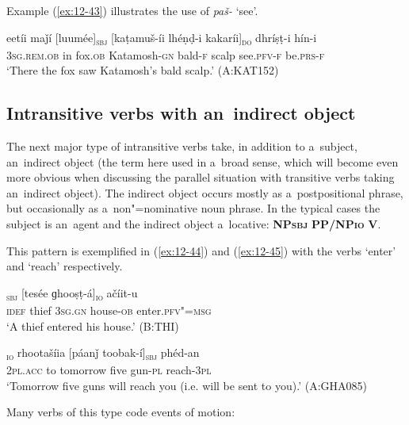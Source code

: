 Example (\ref{ex:12-43}) illustrates the use of \textit{paš-} `see'.

\begin{exe}
\ex
\label{ex:12-43}
\gll eetíi maǰí [luumée]\textsubscript{\textsc{sbj}} [kaṭamuš-íi lhéṇḍ-i kakaríi]\textsubscript{\textsc{do}} dhríṣṭ-i hín-i \\
\textsc{3sg.rem.ob} in fox.\textsc{ob} Katamosh-\textsc{gn} bald-\textsc{f} scalp see.\textsc{pfv-f} be.\textsc{prs-f} \\
\glt `There the fox saw Katamosh's bald scalp.' (A:KAT152)
\end{exe}

\subsection{Intransitive verbs with an~indirect object}
\label{subsec:12-2-4}

The next major type of intransitive verbs take, in addition to a~subject, an~indirect object (the term here used in a~broad sense, which will become even more obvious when discussing the parallel situation with transitive verbs taking an~indirect object). The indirect object occurs mostly as a~postpositional phrase, but occasionally as a~non"=nominative noun phrase. In the typical cases the subject is an~agent and the indirect object a~locative: \textbf{NP\textsc{sbj}} \textbf{PP/NP\textsc{io}} \textbf{V}.


This pattern is exemplified in (\ref{ex:12-44}) and (\ref{ex:12-45}) with the verbs `enter' and `reach' respectively.

\begin{exe}
\ex
\label{ex:12-44}
\gll [ak čoór]\textsubscript{\textsc{sbj}} [tesée ɡhooṣṭ-á]\textsubscript{\textsc{io}} ačíit-u \\
\textsc{idef} thief \textsc{3sg.gn} house-\textsc{ob} enter.\textsc{pfv"=msg} \\
\glt `A thief entered his house.' (B:THI)
\end{exe}
\begin{exe}
\ex
\label{ex:12-45}
\textsubscript{\textsc{io}} rhootašíia [páanǰ toobak-í]\textsubscript{\textsc{sbj}} phéd-an  \\
2\textsc{pl.acc} to tomorrow five gun-\textsc{pl} reach-\textsc{3pl} \\
\glt `Tomorrow five guns will reach you (i.e. will be sent to you).' (A:GHA085)
\end{exe}

Many verbs of this type code events of motion:


